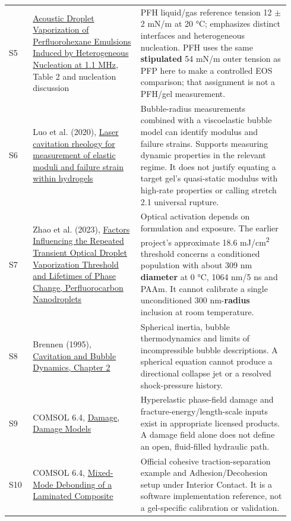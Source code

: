 \documentclass[10pt,a4paper]{article}
\begin{document}
\begin{longtable}{>{\raggedright\arraybackslash}p{0.08\linewidth}>{\raggedright\arraybackslash}p{0.36\linewidth}>{\raggedright\arraybackslash}p{0.5\linewidth}}
S5 & \href{https://doi.org/10.1021/acs.langmuir.3c02272}{Acoustic Droplet Vaporization of Perfluorohexane Emulsions Induced by Heterogeneous Nucleation at 1.1 MHz}, Table 2 and nucleation discussion & PFH liquid/gas reference tension 12 \ensuremath{\pm} 2 mN/m at 20 °C; emphasizes distinct interfaces and heterogeneous nucleation. PFH uses the same \textbf{stipulated} 54 mN/m outer tension as PFP here to make a controlled EOS comparison; that assignment is not a PFH/gel measurement.\\[4pt]
S6 & Luo et al. (2020), \href{https://www.nature.com/articles/s41598-020-68621-y}{Laser cavitation rheology for measurement of elastic moduli and failure strain within hydrogels} & Bubble-radius measurements combined with a viscoelastic bubble model can identify modulus and failure strains. Supports measuring dynamic properties in the relevant regime. It does not justify equating a target gel's quasi-static modulus with high-rate properties or calling stretch 2.1 universal rupture.\\[4pt]
S7 & Zhao et al. (2023), \href{https://doi.org/10.3390/nano13152238}{Factors Influencing the Repeated Transient Optical Droplet Vaporization Threshold and Lifetimes of Phase Change, Perfluorocarbon Nanodroplets} & Optical activation depends on formulation and exposure. The earlier project's approximate 18.6 mJ/cm\textsuperscript{2} threshold concerns a conditioned population with about 309 nm \textbf{diameter} at 0 °C, 1064 nm/5 ns and PAAm. It cannot calibrate a single unconditioned 300 nm-\textbf{radius} inclusion at room temperature.\\[4pt]
S8 & Brennen (1995), \href{https://media.library.caltech.edu/CaltechBOOK:1995.001/chap2.htm}{Cavitation and Bubble Dynamics, Chapter 2} & Spherical inertia, bubble thermodynamics and limits of incompressible bubble descriptions. A spherical equation cannot produce a directional collapse jet or a resolved shock-pressure history.\\[4pt]
S9 & COMSOL 6.4, \href{https://doc.comsol.com/6.4/doc/com.comsol.help.sme/sme_ug_solid.07.040.html}{Damage}, \href{https://doc.comsol.com/6.4/doc/com.comsol.help.sme/sme_ug_theory.06.036.html}{Damage Models} & Hyperelastic phase-field damage and fracture-energy/length-scale inputs exist in appropriate licensed products. A damage field alone does not define an open, fluid-filled hydraulic path.\\[4pt]
S10 & COMSOL 6.4, \href{https://doc.comsol.com/6.4/doc/com.comsol.help.models.sme.cohesive_zone_debonding/cohesive_zone_debonding.html}{Mixed-Mode Debonding of a Laminated Composite} & Official cohesive traction-separation example and Adhesion/Decohesion setup under Interior Contact. It is a software implementation reference, not a gel-specific calibration or validation.\\[4pt]
\bottomrule\end{longtable}
\end{document}
